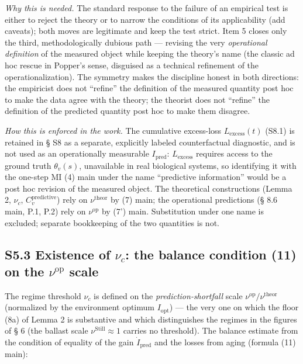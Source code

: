 \documentclass[pdflatex,sn-mathphys-ay]{sn-jnl}
\begin{document}
\emph{Why this is needed.} The standard response to the failure of an empirical test is either to reject the theory or to narrow the conditions of its applicability (add caveats); both moves are legitimate and keep the test strict. Item 5 closes only the third, methodologically dubious path --- revising the very \emph{operational definition} of the measured object while keeping the theory's name (the classic ad hoc rescue in Popper's sense, disguised as a technical refinement of the operationalization). The symmetry makes the discipline honest in both directions: the empiricist does not ``refine'' the definition of the measured quantity post hoc to make the data agree with the theory; the theorist does not ``refine'' the definition of the predicted quantity post hoc to make them disagree.



\emph{How this is enforced in the work.} The cumulative excess-loss \(L_{\text{excess}}(t)\) (S8.1) is retained in § S8 as a separate, explicitly labeled counterfactual diagnostic, and is not used as an operationally measurable \(I_{\text{pred}}\): \(L_{\text{excess}}\) requires access to the ground truth \(\theta_v(s)\), unavailable in real biological systems, so identifying it with the one-step MI (4) main under the name ``predictive information'' would be a post hoc revision of the measured object. The theoretical constructions (Lemma 2, \(\nu_c\), \(C_v^{\text{predictive}}\)) rely on \(\nu^{\text{theor}}\) by (7) main; the operational predictions (§ 8.6 main, P.1, P.2) rely on \(\nu^{\text{op}}\) by (7') main. Substitution under one name is excluded; separate bookkeeping of the two quantities is not.



\subsection*{\texorpdfstring{S5.3 Existence of \(\nu_c\): the balance condition (11) on the \(\nu^{\text{op}}\) scale}{S5.3 Existence of \textbackslash nu\_c: the balance condition (11) on the \textbackslash nu\^{}\{\textbackslash text\{op\}\} scale}}\label{s5.3-existence-of-nu_c-the-balance-condition-11-on-the-nutextop-scale}



The regime threshold \(\nu_c\) is defined on the \emph{prediction-shortfall} scale \(\nu^{\text{op}}/\nu^{\text{theor}}\) (normalized by the environment optimum \(I_{\text{opt}}\)) --- the very one on which the floor (8a) of Lemma 2 is substantive and which distinguishes the regimes in the figures of § 6 (the ballast scale \(\nu^{\text{Still}} \approx 1\) carries no threshold). The balance estimate from the condition of equality of the gain \(\dot{I}_{\text{pred}}\) and the losses from aging (formula (11) main):
\end{document}

